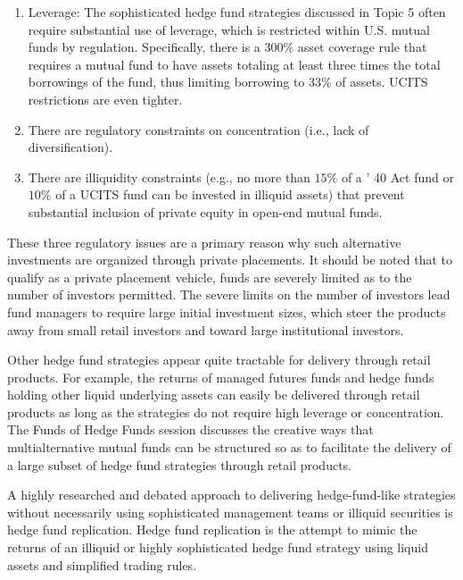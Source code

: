 \documentclass[11pt]{article}
\begin{document}
\begin{enumerate}
  \item Leverage: The sophisticated hedge fund strategies discussed in Topic 5 often require substantial use of leverage, which is restricted within U.S. mutual funds by regulation. Specifically, there is a $300 \%$ asset coverage rule that requires a mutual fund to have assets totaling at least three times the total borrowings of the fund, thus limiting borrowing to $33 \%$ of assets. UCITS restrictions are even tighter.

  \item There are regulatory constraints on concentration (i.e., lack of diversification).

  \item There are illiquidity constraints (e.g., no more than $15 \%$ of a ' 40 Act fund or $10 \%$ of a UCITS fund can be invested in illiquid assets) that prevent substantial inclusion of private equity in open-end mutual funds.

\end{enumerate}

These three regulatory issues are a primary reason why such alternative investments are organized through private placements. It should be noted that to qualify as a private placement vehicle, funds are severely limited as to the number of investors permitted. The severe limits on the number of investors lead fund managers to require large initial investment sizes, which steer the products away from small retail investors and toward large institutional investors.

Other hedge fund strategies appear quite tractable for delivery through retail products. For example, the returns of managed futures funds and hedge funds holding other liquid underlying assets can easily be delivered through retail products as long as the strategies do not require high leverage or concentration. The Funds of Hedge Funds session discusses the creative ways that multialternative mutual funds can be structured so as to facilitate the delivery of a large subset of hedge fund strategies through retail products.

A highly researched and debated approach to delivering hedge-fund-like strategies without necessarily using sophisticated management teams or illiquid securities is hedge fund replication. Hedge fund replication is the attempt to mimic the returns of an illiquid or highly sophisticated hedge fund strategy using liquid assets and simplified trading rules.
\end{document}
